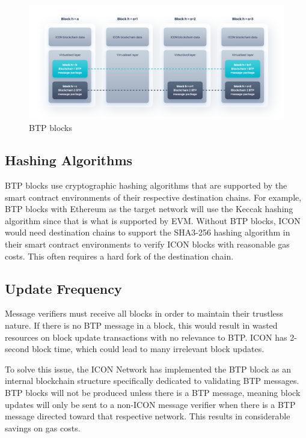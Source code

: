 \documentclass{article}
\newcounter{algo_steps}
\begin{document}
\begin{figure}[!ht]
\begin{center}
\includegraphics[width=13cm]{./images/BTP.png}
\caption{BTP blocks}
\label{fig:btp_blocks}
\end{center}
\end{figure}

\subsection{Hashing Algorithms}
BTP blocks use cryptographic hashing algorithms that are supported by the smart contract environments of their respective destination chains. For example, BTP blocks with Ethereum as the target network will use the Keccak hashing algorithm since that is what is supported by EVM. Without BTP blocks, ICON would need destination chains to support the SHA3-256 hashing algorithm in their smart contract environments to verify ICON blocks with reasonable gas costs. This often requires a hard fork of the destination chain.

\subsection{Update Frequency}
Message verifiers must receive all blocks in order to maintain their trustless nature. If there is no BTP message in a block, this would result in wasted resources on block update transactions with no relevance to BTP. ICON has 2-second block time, which could lead to many irrelevant block updates.

To solve this issue, the ICON Network has implemented the BTP block as an internal blockchain structure specifically dedicated to validating BTP messages. BTP blocks will not be produced unless there is a BTP message, meaning block updates will only be sent to a non-ICON message verifier when there is a BTP message directed toward that respective network. This results in considerable savings on gas costs.
\end{document}
